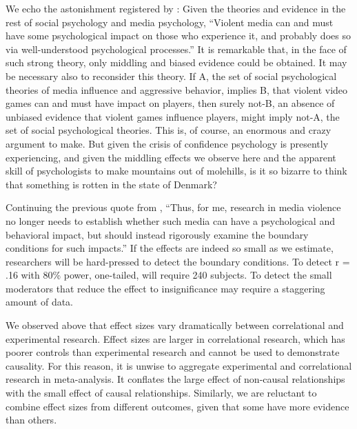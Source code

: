 \documentclass[man]{apa6}
\begin{document}
We echo the astonishment registered by \citet[p. 62]{Warburton:2014}: Given the theories and evidence in the rest of social psychology and media psychology, ``Violent media can and must have some psychological impact on those who experience it, and probably does so via well-understood psychological processes.'' It is remarkable that, in the face of such strong theory, only middling and biased evidence could be obtained. It may be necessary also to reconsider this theory. If A, the set of social psychological theories of media influence and aggressive behavior, implies B, that violent video games can and must have impact on players, then surely not-B, an absence of unbiased evidence that violent games influence players, might imply not-A, the set of social psychological theories. This is, of course, an enormous and crazy argument to make. But given the crisis of confidence psychology is presently experiencing, and given the middling effects we observe here and the apparent skill of psychologists to make mountains out of molehills, is it so bizarre to think that something is rotten in the state of Denmark? %

Continuing the previous quote from \citet[p. 62]{Warburton:2014}, %
``Thus, for me, research in media violence no longer needs to establish whether such media can have a psychological and behavioral impact, but should instead rigorously examine the boundary conditions for such impacts.'' If the effects are indeed so small as we estimate, researchers will be hard-pressed to detect the boundary conditions. To detect r = .16 with 80\% power, one-tailed, will require 240 subjects. To detect the small moderators that reduce the effect to insignificance may require a staggering amount of data.

We observed above that effect sizes vary dramatically between correlational and experimental research. Effect sizes are larger in correlational research, which has poorer controls than experimental research and cannot be used to demonstrate causality. For this reason, it is unwise to aggregate experimental and correlational research in meta-analysis. It conflates the large effect of non-causal relationships with the small effect of causal relationships. Similarly, we are reluctant to combine effect sizes from different outcomes, given that some have more evidence than others. %
\end{document}
